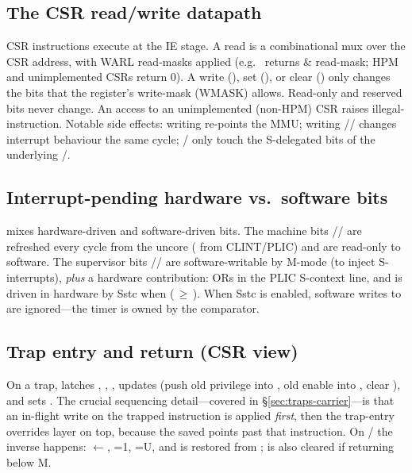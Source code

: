 \subsection{The CSR read/write datapath}
CSR instructions execute at the IE stage. A read is a combinational mux over the
CSR address, with WARL read-masks applied (e.g.\  returns
 \& read-mask; HPM and unimplemented CSRs return 0). A write
(), set (), or clear () only changes the bits
that the register's write-mask (WMASK) allows. Read-only and reserved bits never
change. An access to an unimplemented
(non-HPM) CSR raises illegal-instruction. Notable side effects: writing
 re-points the MMU; writing // changes
interrupt behaviour the same cycle; / only touch the
S-delegated bits of the underlying /.

\subsection{Interrupt-pending hardware vs.\ software bits}
 mixes hardware-driven and software-driven bits. The machine bits
// are refreshed every cycle from the uncore
( from CLINT/PLIC) and are read-only to software. The
supervisor bits // are software-writable by M-mode
(to inject S-interrupts), \emph{plus} a hardware contribution:  ORs in
the PLIC S-context line, and  is driven in hardware by Sstc when
 (\,$\ge$\,). When Sstc is enabled,
software writes to  are ignored---the timer is owned by the comparator.

\subsection{Trap entry and return (CSR view)}
On a trap,  latches , ,
, updates  (push old privilege into , old
enable into , clear ), and sets . The crucial
sequencing detail---covered in \S\ref{sec:traps-carrier}---is that an in-flight
 write on the trapped instruction is applied \emph{first}, then the
trap-entry overrides layer on top, because the saved  points past that
instruction. On / the inverse happens:
$\leftarrow$, =1, =U, and 
is restored from ;  is also cleared if returning below M.
